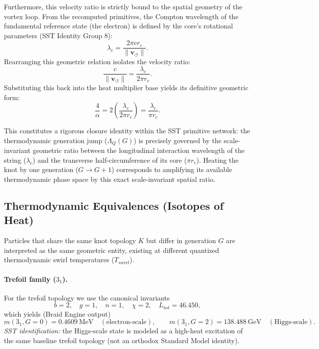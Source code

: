\documentclass[11pt, a4paper]{article}
\newcommand{\vswirl}{\mathbf{v}_{\!\boldsymbol{\circlearrowleft}}}
\newcommand{\rc}{r_c}
\newcommand{\Ltot}{L_{\text{tot}}}
\newcommand{\alphafs}{\alpha}
\begin{document}
                Furthermore, this velocity ratio is strictly bound to the spatial geometry of the vortex loop. From the recomputed primitives, the Compton wavelength of the fundamental reference state (the electron) is defined by the core's rotational parameters (SST Identity Group 8):
                \begin{equation}
                    \lambda_c = \frac{2\pi c \rc}{\lVert \vswirl \rVert}.
                \end{equation}
                Rearranging this geometric relation isolates the velocity ratio:
                \begin{equation}
                    \frac{c}{\lVert \vswirl \rVert} = \frac{\lambda_c}{2\pi \rc}.
                \end{equation}
                Substituting this back into the heat multiplier base yields its definitive geometric form:
                \begin{equation}
                    \frac{4}{\alphafs} = 2 \left( \frac{\lambda_c}{2\pi \rc} \right) = \frac{\lambda_c}{\pi \rc}.
                \end{equation}
                
                This constitutes a rigorous closure identity within the SST primitive network: the thermodynamic generation jump ($\Lambda_Q(G)$) is precisely governed by the scale-invariant geometric ratio between the longitudinal interaction wavelength of the string ($\lambda_c$) and the transverse half-circumference of its core ($\pi \rc$). Heating the knot by one generation ($G \to G+1$) corresponds to amplifying its available thermodynamic phase space by this exact scale-invariant spatial ratio.
            
            \subsection{Thermodynamic Equivalences (Isotopes of Heat)}
                Particles that share the same knot topology $K$ but differ in generation $G$ are interpreted as the same geometric entity, existing at different quantized thermodynamic swirl temperatures ($T_{swirl}$).
                
                \paragraph{Trefoil family ($3_1$).}
                    For the trefoil topology we use the canonical invariants
                    \[
                        b=2,\quad g=1,\quad n=1,\quad \chi=2,\quad \Ltot=46.450,
                    \]
                    which yields (Braid Engine output)
                    \[
                        m(3_1,G=0)=0.4609~\mathrm{MeV}\quad (\text{electron-scale}),\qquad
                        m(3_1,G=2)=138.488~\mathrm{GeV}\quad (\text{Higgs-scale}).
                    \]
                    \emph{SST identification:} the Higgs-scale state is modeled as a high-heat excitation of the same baseline trefoil topology (not an orthodox Standard Model identity).
                
\end{document}
